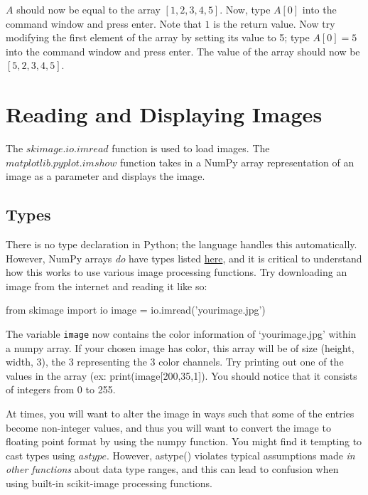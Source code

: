 \documentclass{article}
\begin{document}
$A$ should now be equal to the array $[1,2,3,4,5]$.
Now, type $A[0]$ into the command window and press enter. Note that $1$ is the return value.
Now try modifying the first element of the array by setting its value to 5; type $A[0]=5$ into the command window and press enter. The value of the array should now be $[5,2,3,4,5]$.

\section{Reading and Displaying Images}
The \href{hhttp://scikit-image.org/docs/dev/api/skimage.io.html#skimage.io.imread}{$skimage.io.imread$} function is used to load images.
The \href{https://matplotlib.org/api/_as_gen/matplotlib.pyplot.imshow.html}{$matplotlib.pyplot.imshow$} function takes in a NumPy array representation of an image as a parameter and displays the image.

\subsection{Types}
There is no type declaration in Python; the language handles this automatically. However, NumPy arrays \textit{do} have types listed \href{https://docs.scipy.org/doc/numpy/user/basics.types.html}{here}, and it is critical to understand how this works to use various image processing functions.
Try downloading an image from the internet and reading it like so:
\begin{python}
from skimage import io
image = io.imread('yourimage.jpg')
\end{python}

The variable \texttt{image} now contains the color information of `yourimage.jpg' within a numpy array. If your chosen image has color, this array will be of size (height, width, 3), the 3 representing the 3 color channels. Try printing out one of the values in the array (ex: print(image[200,35,1]). You should notice that it consists of integers from 0 to 255.

At times, you will want to alter the image in ways such that some of the entries become non-integer values, and thus you will want to convert the image to floating point format by using the numpy function. You might find it tempting to cast types using \href{https://docs.scipy.org/doc/numpy-1.15.0/reference/generated/numpy.ndarray.astype.html}{$astype$}. However, astype() violates typical assumptions made \emph{in other functions} about data type ranges, and this can lead to confusion when using built-in scikit-image processing functions.
\end{document}
